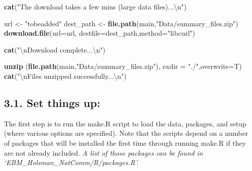 \documentclass[]{article}
\newenvironment{Shaded}{\begin{snugshade}}{\end{snugshade}}
\newcommand{\KeywordTok}[1]{\textcolor[rgb]{0.13,0.29,0.53}{\textbf{{#1}}}}
\newcommand{\DataTypeTok}[1]{\textcolor[rgb]{0.13,0.29,0.53}{{#1}}}
\newcommand{\CharTok}[1]{\textcolor[rgb]{0.31,0.60,0.02}{{#1}}}
\newcommand{\StringTok}[1]{\textcolor[rgb]{0.31,0.60,0.02}{{#1}}}
\newcommand{\NormalTok}[1]{{#1}}
\begin{document}
\begin{Shaded}
\begin{Highlighting}[]
    \KeywordTok{cat}\NormalTok{(}\StringTok{"The download takes a few mins (large data files)...}\CharTok{\textbackslash{}n}\StringTok{"}\NormalTok{)}

    \NormalTok{url       <-}\StringTok{ "tobeadded"} 
    \NormalTok{dest_path  <-}\StringTok{  }\KeywordTok{file.path}\NormalTok{(main,}\StringTok{"Data/summary_files.zip"}\NormalTok{)}
    \KeywordTok{download.file}\NormalTok{(}\DataTypeTok{url=}\NormalTok{url, }\DataTypeTok{destfile=}\NormalTok{dest_path,}\DataTypeTok{method=}\StringTok{"libcurl"}\NormalTok{)}
    
    \KeywordTok{cat}\NormalTok{(}\StringTok{"}\CharTok{\textbackslash{}n}\StringTok{Download complete...}\CharTok{\textbackslash{}n}\StringTok{"}\NormalTok{)}
    
    \KeywordTok{unzip} \NormalTok{(}\KeywordTok{file.path}\NormalTok{(main,}\StringTok{"Data/summary_files.zip"}\NormalTok{), }\DataTypeTok{exdir =} \StringTok{"./"}\NormalTok{,}\DataTypeTok{overwrite=}\NormalTok{T)}
    \KeywordTok{cat}\NormalTok{(}\StringTok{"}\CharTok{\textbackslash{}n}\StringTok{Files unzipped successfully...}\CharTok{\textbackslash{}n}\StringTok{"}\NormalTok{)}
\end{Highlighting}
\end{Shaded}

\subsection{3.1. Set things up:}\label{set-things-up}

The first step is to run the make.R script to load the data, packages,
and setup (where various options are specified). Note that the scripts
depend on a number of packages that will be installed the first time
through running make.R if they are not already included. \emph{A list of
those packages can be found in `EBM\_Holsman\_NatComm/R/packages.R'.}
\end{document}
